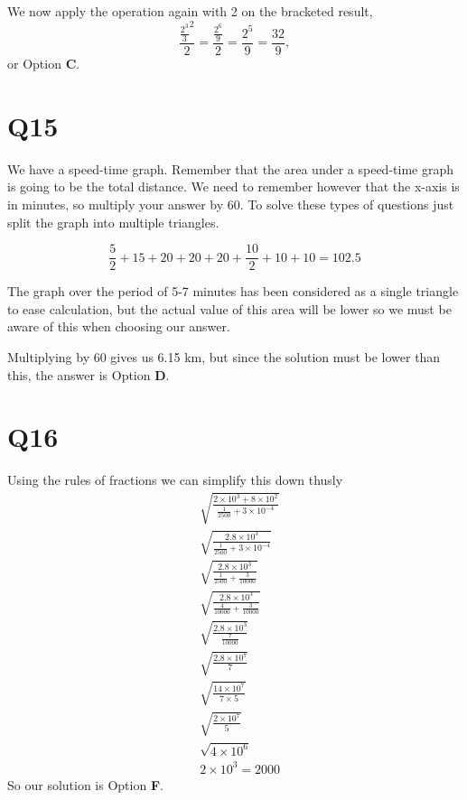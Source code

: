 \documentclass[11pt]{article}
\begin{document}
We now apply the operation again with 2 on the bracketed result,
\begin{equation}
\frac{\frac{2^3}{3}^2}{2} = \frac{\frac{2^6}{9}}{2} = \frac{2^5}{9} = \frac{32}{9},
\end{equation}
or Option \textbf{C}.

\section*{Q15}
We have a speed-time graph.  Remember that the area under a speed-time graph is going to be the total distance. We need to remember however that the x-axis is in minutes, so multiply your answer by 60.  To solve these types of questions just split the graph into multiple triangles.

\begin{equation*}
\frac{5}{2} + 15 + 20 + 20 + 20 + \frac{10}{2} + 10 + 10 = 102.5
\end{equation*}

The graph over the period of 5-7 minutes has been considered as a single triangle to ease calculation, but the actual value of this area will be lower so we must be aware of this when choosing our answer.

Multiplying by 60 gives us 6.15 km, but since the solution must be lower than this, the answer is Option \textbf{D}.

\section*{Q16}
Using the rules of fractions we can simplify this down thusly
\begin{equation*}
\begin{aligned}
&\sqrt{\frac{2\times10^3 + 8 \times 10^2}{\frac{1}{2500} + 3\times10^{-4}}}\\
&\sqrt{\frac{2.8 \times 10^3}{\frac{1}{2500} + 3\times10^{-4}}}\\
&\sqrt{\frac{2.8 \times 10^3}{\frac{1}{2500} + \frac{3}{10000}}}\\
&\sqrt{\frac{2.8 \times 10^3}{\frac{4}{10000} + \frac{3}{10000}}}\\
&\sqrt{\frac{2.8 \times 10^3}{\frac{7}{10000}}}\\
&\sqrt{\frac{2.8 \times 10^7}{7}}\\
&\sqrt{\frac{14 \times 10^7}{7 \times 5}}\\
&\sqrt{\frac{2 \times 10^7}{5}}\\
&\sqrt{4 \times 10^6}\\
&2\times10^3 = 2000
\end{aligned}
\end{equation*}
So our solution is Option \textbf{F}.
\end{document}
